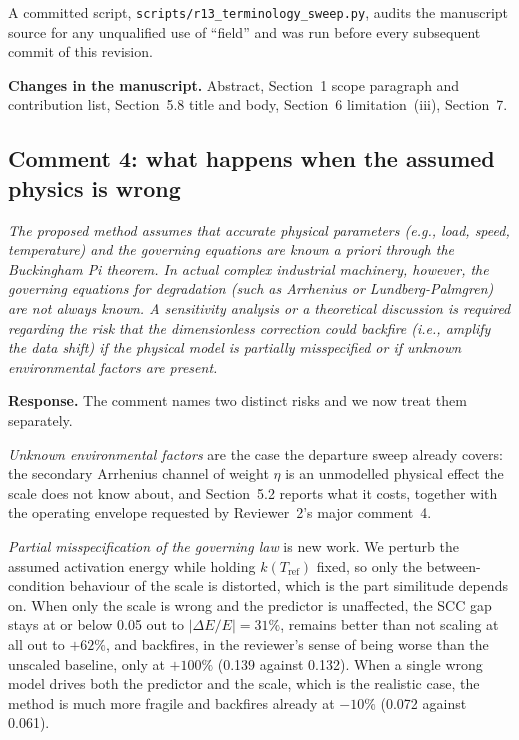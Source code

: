 \documentclass[11pt,a4paper]{article}
\newenvironment{comment}
  {\begin{list}{}{\leftmargin=6mm \rightmargin=2mm}\item[]\color{quoteline}\itshape}
  {\end{list}}
\newcommand{\where}[1]{\textbf{Changes in the manuscript.} #1}
\begin{document}
A committed script, \texttt{scripts/r13\_terminology\_sweep.py}, audits the manuscript source for
any unqualified use of ``field'' and was run before every subsequent commit of this revision.

\where{Abstract, Section~1 scope paragraph and contribution list, Section~5.8 title and body,
Section~6 limitation~(iii), Section~7.}

\subsection*{Comment 4: what happens when the assumed physics is wrong}
\begin{comment}
The proposed method assumes that accurate physical parameters (e.g., load, speed, temperature) and
the governing equations are known a priori through the Buckingham Pi theorem. In actual complex
industrial machinery, however, the governing equations for degradation (such as Arrhenius or
Lundberg-Palmgren) are not always known. A sensitivity analysis or a theoretical discussion is
required regarding the risk that the dimensionless correction could backfire (i.e., amplify the
data shift) if the physical model is partially misspecified or if unknown environmental factors are
present.
\end{comment}

\noindent\textbf{Response.} The comment names two distinct risks and we now treat them separately.

\emph{Unknown environmental factors} are the case the departure sweep already covers: the secondary
Arrhenius channel of weight $\eta$ is an unmodelled physical effect the scale does not know about,
and Section~5.2 reports what it costs, together with the operating envelope requested by
Reviewer~2's major comment~4.

\emph{Partial misspecification of the governing law} is new work. We perturb the assumed activation
energy while holding $k(T_{\mathrm{ref}})$ fixed, so only the between-condition behaviour of the
scale is distorted, which is the part similitude depends on. When only the scale is wrong and the
predictor is unaffected, the SCC gap stays at or below 0.05 out to $\lvert\Delta E/E\rvert=31\%$,
remains better than not scaling at all out to $+62\%$, and backfires, in the reviewer's sense of
being worse than the unscaled baseline, only at $+100\%$ (0.139 against 0.132). When a single wrong
model drives both the predictor and the scale, which is the realistic case, the method is much more
fragile and backfires already at $-10\%$ (0.072 against 0.061).
\end{document}
